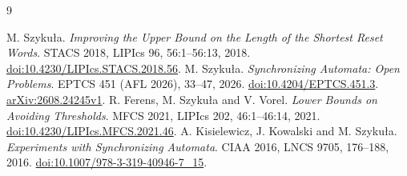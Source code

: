 \documentclass[10pt]{article}
\begin{document}
\begin{thebibliography}{9}
\raggedright
{} M. Szyku\l a.
\emph{Improving the Upper Bound on the Length of the Shortest Reset Words}.
STACS 2018, LIPIcs 96, 56:1--56:13, 2018.
\href{https://doi.org/10.4230/LIPIcs.STACS.2018.56}{doi:10.4230/LIPIcs.STACS.2018.56}.
 M. Szyku\l a.
\emph{Synchronizing Automata: Open Problems}.
EPTCS 451 (AFL 2026), 33--47, 2026.
\href{https://doi.org/10.4204/EPTCS.451.3}{doi:10.4204/EPTCS.451.3}.
\href{https://arxiv.org/abs/2608.24245v1}{arXiv:2608.24245v1}.
 R. Ferens, M. Szyku\l a and V. Vorel.
\emph{Lower Bounds on Avoiding Thresholds}.
MFCS 2021, LIPIcs 202, 46:1--46:14, 2021.
\href{https://doi.org/10.4230/LIPIcs.MFCS.2021.46}{doi:10.4230/LIPIcs.MFCS.2021.46}.
 A. Kisielewicz, J. Kowalski and M. Szyku\l a.
\emph{Experiments with Synchronizing Automata}.
CIAA 2016, LNCS 9705, 176--188, 2016.
\href{https://doi.org/10.1007/978-3-319-40946-7_15}{doi:10.1007/978-3-319-40946-7\_15}.
\end{thebibliography}
\end{document}
